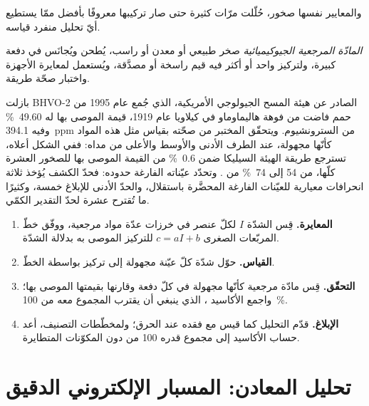 والمعايير نفسها صخور، حُلّلت مرّات كثيرة حتى صار تركيبها معروفًا بأفضل ممّا
يستطيع أيّ تحليل منفرد قياسه.

\begin{definition}\label{def:b2:field-lab-methods-2:rm}
\emph{المادّة المرجعية الجيوكيميائية} صخر طبيعي أو
معدن أو راسب، يُطحن ويُجانَس في دفعة كبيرة، ولتركيز واحد أو أكثر فيه
قيم راسخة أو مصدَّقة، ويُستعمل لمعايرة الأجهزة واختبار صحّة
طريقة.
\end{definition}

بازلت BHVO-2 الصادر عن هيئة المسح الجيولوجي الأمريكية، الذي جُمع عام 1995 من حمم فاضت من فوهة هاليماوماو في
كيلاويا عام 1919، قيمة  الموصى بها له \qty{49.60}{\percent} وفيه \qty{394.1}{ppm} من
السترونشيوم. ويتحقّق المختبر من صحّته بقياس مثل هذه المواد كأنّها مجهولة، عند الطرف الأدنى
والأوسط والأعلى من مداه: ففي الشكل أعلاه، تسترجع طريقة الهيئة السيليكا ضمن
\qty{0.6}{\percent} من القيمة الموصى بها للصخور العشرة كلّها، من 54 إلى
\qty{74}{\percent} من . وتحدّد عيّناته الفارغة حدوده: فحدّ الكشف يُؤخذ ثلاثة انحرافات
معيارية للعيّنات الفارغة المحضَّرة باستقلال، والحدّ الأدنى للإبلاغ خمسة، وكثيرًا ما تُقترح عشرة
لحدّ التقدير الكمّي.

\begin{method}\label{met:b2:field-lab-methods-2:calibration}
\begin{enumerate}
  \item \textbf{المعايرة.} قِس الشدّة $I$ لكلّ عنصر في خرزات عدّة مواد
        مرجعية، ووفّق خطّ المربّعات الصغرى $c = aI + b$ للتركيز الموصى به
        بدلالة الشدّة.
  \item \textbf{القياس.} حوّل شدّة كلّ عيّنة مجهولة إلى تركيز بواسطة الخطّ.
  \item \textbf{التحقّق.} قِس مادّة مرجعية كأنّها مجهولة في كلّ دفعة وقارنها
        بقيمتها الموصى بها؛ واجمع الأكاسيد ، الذي ينبغي أن يقترب المجموع معه
        من \qty{100}{\percent}.
  \item \textbf{الإبلاغ.} قدّم التحليل كما قيس مع فقده عند الحرق؛ ولمخطّطات
        التصنيف، أعد حساب الأكاسيد إلى مجموع قدره 100 من دون المكوّنات المتطايرة.
\end{enumerate}
\end{method}

\section{تحليل المعادن: المسبار الإلكتروني الدقيق}\label{sec:b2:field-lab-methods-2:microprobe}

